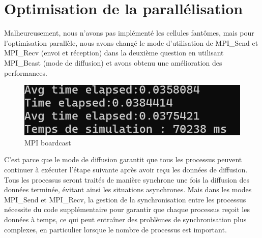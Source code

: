 \chapter{Optimisation de la parallélisation}
\par
Malheureusement, nous n'avons pas implémenté les cellules fantômes, mais pour l'optimisation parallèle, nous avons changé le mode d'utilisation de MPI\_Send et MPI\_Recv (envoi et réception) dans la deuxième question en utilisant MPI\_Bcast (mode de diffusion) et avons obtenu une amélioration des performances.\begin{figure}[h]
    \centering
    \includegraphics[width=0.9\linewidth]{mpi_broadcast.png}
    \caption{MPI boardcast}
    \label{fig:enter-label}
\end{figure}
\par C'est parce que le mode de diffusion garantit que tous les processus peuvent continuer à exécuter l'étape suivante après avoir reçu les données de diffusion. Tous les processus seront traités de manière synchrone une fois la diffusion des données terminée, évitant ainsi les situations asynchrones. 
Mais dans les modes MPI\_Send et MPI\_Recv, la gestion de la synchronisation entre les processus nécessite du code supplémentaire pour garantir que chaque processus reçoit les données à temps, ce qui peut entraîner des problèmes de synchronisation plus complexes, en particulier lorsque le nombre de processus est important.